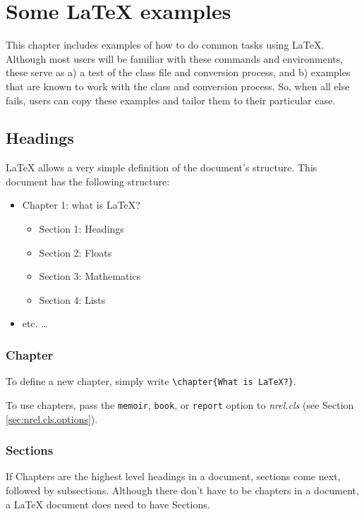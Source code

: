 \chapter{Some LaTeX examples}
This chapter includes examples of how to do common tasks using LaTeX{}. Although most users will be familiar with these commands and environments, these serve as a) a test of the class file and conversion process, and b) examples that are known to work with the class and conversion process. So, when all else fails, users can copy these examples and tailor them to their particular case.

\section{Headings}
LaTeX{} allows a very simple definition of the document's structure. This document has the following structure:
\begin{itemize}
\item Chapter 1: what is LaTeX?
\begin{itemize}
\item Section 1: Headings
\item Section 2: Floats
\item Section 3: Mathematics
\item Section 4: Lists
\end{itemize}
\item etc. \ldots
\end{itemize}

\subsection{Chapter}
To define a new chapter, simply write \verb+\chapter{What is LaTeX?}+.

To use chapters, pass the \texttt{memoir}, \texttt{book}, or \texttt{report} option to \emph{nrel.cls} (see Section \ref{sec:nrel.cls.options}).

\subsection{Sections}
If Chapters are the highest level headings in a document, sections come next, followed by subsections. Although there don't have to be chapters in a document, a LaTeX document does need to have Sections.


